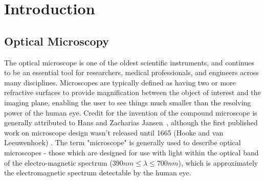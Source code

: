 \chapter{Introduction}\label{ch:introduction}

\section{Optical Microscopy}

The optical microscope is one of the oldest scientific instruments, and continues to be an essential tool for researchers, medical professionals, and engineers across many disciplines. Microscopes are typically defined as having two or more refractive surfaces to provide magnification between the object of interest and the imaging plane, enabling the user to see things much smaller than the resolving power of the human eye. Credit for the invention of the compound microscope is generally attributed to Hans and Zacharias Jansen~\cite{van2010origins}, although the first published work on microscope design wasn't released until 1665 (Hooke and van Leeuwenhoek) \cite{natureMilestones,hookeMicrographica}. The term "microscope" is generally used to describe optical microscopes - those which are designed for use with light within the optical band of the electro-magnetic spectrum ($390nm \leq \lambda \leq 700nm$), which is approximately the electromagnetic spectrum detectable by the human eye.

